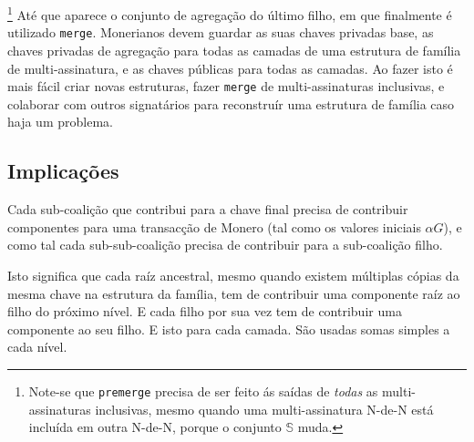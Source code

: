 \footnote{Note-se que {\tt premerge} precisa de ser feito ás saídas de {\em todas} as multi-assinaturas inclusivas, mesmo quando uma multi-assinatura N-de-N está incluída em outra N-de-N, porque o conjunto $\mathbb{S}$ muda.}
Até que aparece o conjunto de agregação do último filho, em que finalmente é utilizado {\tt merge}.
Monerianos devem guardar as suas chaves privadas base, as chaves privadas de agregação para todas as camadas de uma estrutura de família de multi-assinatura, e as chaves públicas para todas as camadas. Ao fazer isto é mais fácil criar novas estruturas, fazer {\tt merge} de multi-assinaturas inclusivas, e colaborar com outros signatários para reconstruír uma estrutura de família caso haja um problema.  



\subsection{Implicações}

Cada sub-coalição que contribui para a chave final precisa de contribuir componentes para uma transacção de Monero (tal como os valores iniciais $\alpha G$), e como tal cada sub-sub-coalição precisa de contribuir para a sub-coalição filho.


Isto significa que cada raíz ancestral, mesmo quando existem múltiplas cópias da mesma chave na estrutura da família, tem de contribuir uma componente raíz ao filho do próximo nível. E cada filho por sua vez tem de contribuir uma componente ao seu filho. E isto para cada camada. São usadas somas simples a cada nível.   

